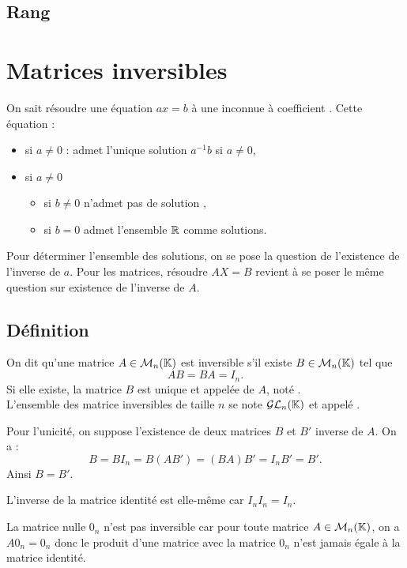 \documentclass{book}
\begin{document}
\subsection{Rang}
\section{Matrices inversibles}
On sait résoudre une équation $a x = b$ à une inconnue à coefficient .   Cette équation  :
\begin{itemize}
\item si $a\neq 0$ : admet l'unique solution $a^{-1}b$ si $a\neq 0$,
\item si $a\neq 0$ 
\begin{itemize}
\item si $b\neq 0$ n'admet pas de solution ,
\item si $b=0$  admet l'ensemble $\mathbb{R}$ comme solutions.
\end{itemize}
\end{itemize}
Pour déterminer l'ensemble des solutions, on se pose la question de l'existence de l'inverse de $a$. Pour les matrices, résoudre $AX = B$ revient à se poser le même question sur  existence de l'inverse de $A$.
\subsection{Définition}
\begin{DefinitionProposition}[Inverse]
On dit qu'une matrice $A\in\mathcal{M}_{n}(\mathbb{K})$ est inversible s'il existe $B\in\mathcal{M}_{n}(\mathbb{K})$ tel que $$AB=BA=I_n.$$ 
Si elle existe, la matrice $B$ est  unique et appelée  de $A$, noté .\\
L'ensemble des matrice inversibles de taille $n$ se note $\mathcal{GL}_n(\mathbb{K})$ et appelé .  
\end{DefinitionProposition}
\begin{Demonstration}
Pour l'unicité, on suppose l'existence de deux matrices $B$ et $B'$ inverse de $A$. On a :
$$ B = BI_n =B(AB')=(BA)B'=I_n B'=B'.$$
Ainsi $B=B'$.
\end{Demonstration}
\begin{Exemple}
L'inverse de la matrice identité est elle-même car $I_nI_n=I_n$.
\end{Exemple}
\begin{Exemple}
La matrice nulle $0_n$ n'est pas inversible car  pour toute matrice $A\in\mathcal{M}_{n}(\mathbb{K})$, on a
$A 0_n = 0_n$ donc le produit d'une matrice avec la matrice $0_n$ n'est jamais égale à la matrice identité.
\end{Exemple}
\end{document}

